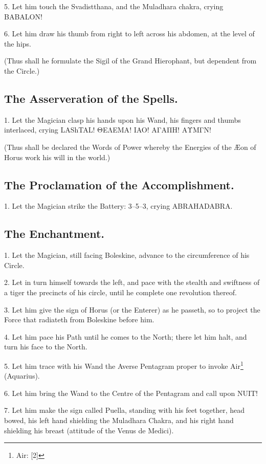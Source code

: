 5. Let him touch the Svadistthana, and the Muladhara chakra, crying BABALON!

6. Let him draw his thumb from right to left across his abdomen, at the level of the hips.

(Thus shall he formulate the Sigil of the Grand Hierophant, but dependent from the Circle.)

\subsection*{The Asserveration of the Spells.}

1. Let the Magician clasp his hands upon his Wand, his fingers and thumbs interlaced, crying LAShTAL! \textgreek{ΘΕΛΕΜΑ}! \textgreek{\textDigamma{}IAO\textDigamma{}}! \textgreek{ΑΓΑΠΗ}! \textgreek{ΑΥΜΓΝ}!

(Thus shall be declared the Words of Power whereby the Energies of the \AE{}on of Horus work his will in the world.)

\subsection*{The Proclamation of the Accomplishment.}

1. Let the Magician strike the Battery: 3–5–3, crying ABRAHADABRA.

\subsection*{The Enchantment.}

1. Let the Magician, still facing Boleskine, advance to the circumference of his Circle.

2. Let in turn himself towards the left, and pace with the stealth and swiftness of a tiger the precincts of his circle, until he complete one revolution thereof.

3. Let him give the sign of Horus (or the Enterer) as he passeth, so to project the Force that radiateth from Boleskine before him.

4. Let him pace his Path until he comes to the North; there let him halt, and turn his face to the North.

5. Let him trace with his Wand the Averse Pentagram proper to invoke Air\footnote{Air: [2]} (Aquarius).

6. Let him bring the Wand to the Centre of the Pentagram and call upon NUIT!

7. Let him make the sign called Puella, standing with his feet together, head bowed, his left hand shielding the Muladhara Chakra, and his right hand shielding his breast (attitude of the Venus de Medici).

